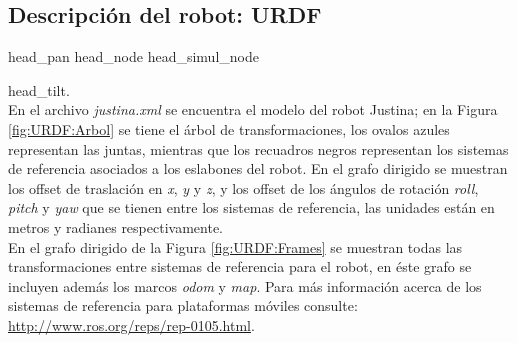 \documentclass[a4paper,usenames,dvipsnames,svgnames,table]{book}
\begin{document}

\subsection{Descripción del robot: URDF}
head\_pan        head\_node head\_simul\_node

head\_tilt.\\

En el archivo \textit{justina.xml} se encuentra el modelo del robot Justina; en la Figura   \ref{fig:URDF:Arbol} se tiene el árbol de transformaciones, los ovalos azules representan las juntas, mientras que los recuadros negros representan los sistemas de referencia asociados a los eslabones del robot. En el grafo dirigido se muestran los offset de traslación en \textit{x}, \textit{y} y \textit{z}, y los offset de los ángulos de rotación \textit{roll}, \textit{pitch} y \textit{yaw} que se tienen entre los sistemas de referencia, las unidades están en metros y radianes respectivamente.\\

En el grafo dirigido de la Figura \ref{fig:URDF:Frames} se muestran todas las transformaciones entre sistemas de referencia para el robot, en éste grafo se incluyen además los marcos \textit{odom} y \textit{map}. Para más información acerca de los sistemas de referencia para plataformas móviles consulte: \url{http://www.ros.org/reps/rep-0105.html}.
\end{document}
